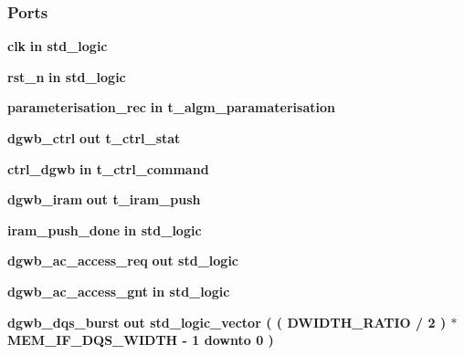 \subsubsection*{Ports}
 \begin{DoxyCompactItemize}
\item 
{\bf clk}  {\bfseries {\bfseries \textcolor{keywordflow}{in}\textcolor{vhdlchar}{ }}} {\bfseries \textcolor{comment}{std\+\_\+logic}\textcolor{vhdlchar}{ }} 
\item 
{\bf rst\+\_\+n}  {\bfseries {\bfseries \textcolor{keywordflow}{in}\textcolor{vhdlchar}{ }}} {\bfseries \textcolor{comment}{std\+\_\+logic}\textcolor{vhdlchar}{ }} 
\item 
{\bf parameterisation\+\_\+rec}  {\bfseries {\bfseries \textcolor{keywordflow}{in}\textcolor{vhdlchar}{ }}} {\bfseries {\bfseries {\bf t\+\_\+algm\+\_\+paramaterisation}} \textcolor{vhdlchar}{ }} 
\item 
{\bf dgwb\+\_\+ctrl}  {\bfseries {\bfseries \textcolor{keywordflow}{out}\textcolor{vhdlchar}{ }}} {\bfseries {\bfseries {\bf t\+\_\+ctrl\+\_\+stat}} \textcolor{vhdlchar}{ }} 
\item 
{\bf ctrl\+\_\+dgwb}  {\bfseries {\bfseries \textcolor{keywordflow}{in}\textcolor{vhdlchar}{ }}} {\bfseries {\bfseries {\bf t\+\_\+ctrl\+\_\+command}} \textcolor{vhdlchar}{ }} 
\item 
{\bf dgwb\+\_\+iram}  {\bfseries {\bfseries \textcolor{keywordflow}{out}\textcolor{vhdlchar}{ }}} {\bfseries {\bfseries {\bf t\+\_\+iram\+\_\+push}} \textcolor{vhdlchar}{ }} 
\item 
{\bf iram\+\_\+push\+\_\+done}  {\bfseries {\bfseries \textcolor{keywordflow}{in}\textcolor{vhdlchar}{ }}} {\bfseries \textcolor{comment}{std\+\_\+logic}\textcolor{vhdlchar}{ }} 
\item 
{\bf dgwb\+\_\+ac\+\_\+access\+\_\+req}  {\bfseries {\bfseries \textcolor{keywordflow}{out}\textcolor{vhdlchar}{ }}} {\bfseries \textcolor{comment}{std\+\_\+logic}\textcolor{vhdlchar}{ }} 
\item 
{\bf dgwb\+\_\+ac\+\_\+access\+\_\+gnt}  {\bfseries {\bfseries \textcolor{keywordflow}{in}\textcolor{vhdlchar}{ }}} {\bfseries \textcolor{comment}{std\+\_\+logic}\textcolor{vhdlchar}{ }} 
\item 
{\bf dgwb\+\_\+dqs\+\_\+burst}  {\bfseries {\bfseries \textcolor{keywordflow}{out}\textcolor{vhdlchar}{ }}} {\bfseries \textcolor{comment}{std\+\_\+logic\+\_\+vector}\textcolor{vhdlchar}{ }\textcolor{vhdlchar}{(}\textcolor{vhdlchar}{ }\textcolor{vhdlchar}{(}\textcolor{vhdlchar}{ }\textcolor{vhdlchar}{ }\textcolor{vhdlchar}{ }\textcolor{vhdlchar}{ }{\bfseries {\bf D\+W\+I\+D\+T\+H\+\_\+\+R\+A\+T\+IO}} \textcolor{vhdlchar}{/}\textcolor{vhdlchar}{ } \textcolor{vhdldigit}{2} \textcolor{vhdlchar}{ }\textcolor{vhdlchar}{)}\textcolor{vhdlchar}{ }\textcolor{vhdlchar}{$\ast$}\textcolor{vhdlchar}{ }\textcolor{vhdlchar}{ }\textcolor{vhdlchar}{ }{\bfseries {\bf M\+E\+M\+\_\+\+I\+F\+\_\+\+D\+Q\+S\+\_\+\+W\+I\+D\+TH}} \textcolor{vhdlchar}{-\/}\textcolor{vhdlchar}{ } \textcolor{vhdldigit}{1} \textcolor{vhdlchar}{ }\textcolor{keywordflow}{downto}\textcolor{vhdlchar}{ }\textcolor{vhdlchar}{ } \textcolor{vhdldigit}{0} \textcolor{vhdlchar}{ }\textcolor{vhdlchar}{)}\textcolor{vhdlchar}{ }} 

\end{DoxyCompactItemize}
